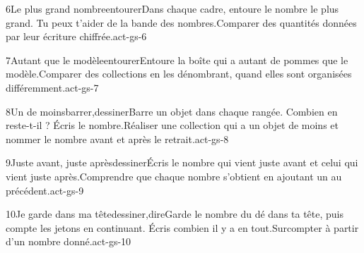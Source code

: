 \begin{activite}{6}{Le plus grand nombre}{entourer}{Dans chaque cadre, {\otBold\color{otNavy}entoure} le nombre le plus grand. Tu peux t’aider de la bande des nombres.}{Comparer des quantités données par leur écriture chiffrée.}{act-gs-6}
\end{activite}
\begin{activite}{7}{Autant que le modèle}{entourer}{Entoure la boîte qui a {\otBold\color{otNavy}autant} de pommes que le modèle.}{Comparer des collections en les dénombrant, quand elles sont organisées différemment.}{act-gs-7}
\end{activite}
\begin{activite}{8}{Un de moins}{barrer,dessiner}{Barre {\otBold\color{otNavy}un} objet dans chaque rangée. Combien en reste-t-il ? Écris le nombre.}{Réaliser une collection qui a un objet de moins et nommer le nombre avant et après le retrait.}{act-gs-8}
\end{activite}
\begin{activite}{9}{Juste avant, juste après}{dessiner}{Écris le nombre qui vient {\otBold\color{otNavy}juste avant} et celui qui vient {\otBold\color{otNavy}juste après}.}{Comprendre que chaque nombre s’obtient en ajoutant un au précédent.}{act-gs-9}
\end{activite}
\begin{activite}{10}{Je garde dans ma tête}{dessiner,dire}{Garde le nombre du dé dans ta tête, puis compte les jetons en continuant. {\otBold\color{otNavy}Écris} combien il y a en tout.}{Surcompter à partir d’un nombre donné.}{act-gs-10}
\end{activite}
